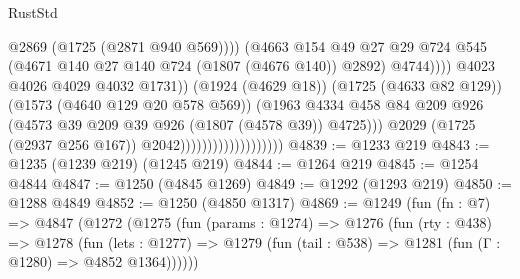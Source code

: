\begin{lexlean}{RustStd}
\begin{coremodule}
                                                          @2869
                                                          (@1725 (@2871 @940 @569))))
                                                      (@4663
                                                        @154
                                                        @49
                                                        @27
                                                        @29
                                                        @724
                                                        @545
                                                        (@4671
                                                          @140
                                                          @27
                                                          @140
                                                          @724
                                                          (@1807 (@4676 @140))
                                                          @2892)
                                                        @4744))))
                                                @4023
                                                @4026
                                                @4029
                                                @4032
                                                @1731))
                                            (@1924 (@4629 @18))
                                            (@1725 (@4633 @82 @129))
                                            (@1573 (@4640 @129 @20 @578 @569))
                                            (@1963
                                              @4334
                                              @458
                                              @84
                                              @209
                                              @926
                                              (@4573 @39 @209 @39 @926 (@1807 (@4578 @39)) @4725)))
                                          @2029
                                          (@1725 (@2937 @256 @167))
                                          @2042)))))))))))))))))))
@4839 := @1233 @219
@4843 := @1235 (@1239 @219) (@1245 @219)
@4844 := @1264 @219
@4845 := @1254 @4844
@4847 := @1250 (@4845 @1269)
@4849 := @1292 (@1293 @219)
@4850 := @1288 @4849
@4852 := @1250 (@4850 @1317)
@4869 := @1249
    (fun (fn : @7) =>
    @4847
      (@1272
        (@1275
          (fun (params : @1274) =>
          @1276
            (fun (rty : @438) =>
            @1278
              (fun (lets : @1277) =>
              @1279 (fun (tail : @538) => @1281 (fun (Γ : @1280) => @4852 @1364))))))

\end{coremodule}
\end{lexlean}
